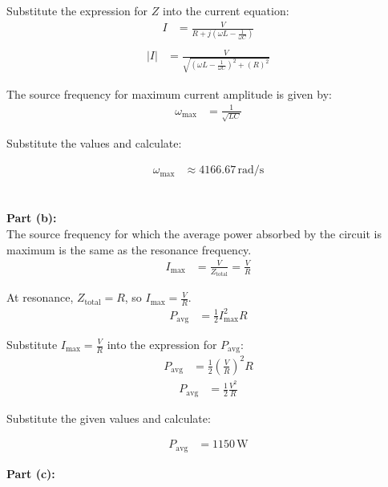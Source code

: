 \documentclass[journal,12pt,twocolumn]{IEEEtran}
\theoremstyle{remark}
\begin{document}
Substitute the expression for \(Z\) into the current equation:
\begin{align}
    I &= \frac{V}{R + j(\omega L - \frac{1}{\omega C})} \\
\end{align}
\begin{align}
    |I| &= \frac{V}{\sqrt{(\omega L- \frac{1}{\omega C})^2 + (R)^2}}
\end{align}


The source frequency for maximum current amplitude is given by:
\begin{align}
    \omega_{\text{max}} &= \frac{1}{\sqrt{LC}}
\end{align}

Substitute the values and calculate:

\begin{align}
    \omega_{\text{max}} &\approx 4166.67 \, \text{rad/s}
\end{align}\\\\
\textbf{Part (b):}\\

The source frequency for which the average power absorbed by the circuit is maximum is the same as the resonance frequency. 
\begin{align}
    I_{\text{max}} &= \frac{V}{Z_{\text{total}}} = \frac{V}{R}
\end{align}

At resonance, \(Z_{\text{total}} = R\), so \(I_{\text{max}} = \frac{V}{R}\).
\begin{align}
    P_{\text{avg}} &= \frac{1}{2} I_{\text{max}}^2 R
\end{align}

Substitute \(I_{\text{max}} = \frac{V}{R}\) into the expression for \(P_{\text{avg}}\):
\begin{align}
    P_{\text{avg}} &= \frac{1}{2} \left(\frac{V}{R}\right)^2 R
\end{align}
\begin{align}
    P_{\text{avg}} &= \frac{1}{2} \frac{V^2}{R}
    \label{eq:9}
\end{align}

Substitute the given values and calculate:

\begin{align}
    P_{\text{avg}} &= 1150 \, \text{W}
\end{align}

\textbf{Part (c):}\\
 
\end{document}
